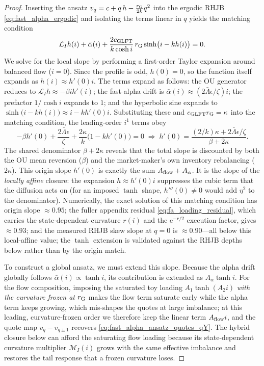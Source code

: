 \documentclass[11pt,a4paper]{article}
\newcommand{\Lcal}{\mathcal{L}}
\newcommand{\e}{\mathrm e}
\newcommand{\alphabar}{\bar\alpha}
\theoremstyle{plain}
\theoremstyle{definition}
\begin{document}
\begin{proof}
Inserting the ansatz \(v_q=c+q\,h-\frac{r_{\rm G}}{2k}q^2\) into the ergodic RHJB \eqref{eq:fast_alpha_ergodic} and isolating the terms linear in \(q\) yields the matching condition
\[
\Lcal_I h(i)+\alphabar(i)+\frac{2c_{\rm GLFT}}{k\cosh i}\,r_{\rm G}\sinh\bigl(i-kh(i)\bigr)=0.
\]
We solve for the local slope by performing a first-order Taylor expansion around balanced flow (\(i=0\)). Since the profile is odd, \(h(0)=0\), so the function itself expands as \(h(i)\approx h'(0)i\). The terms expand as follows: the OU generator reduces to \(\Lcal_I h\approx-\beta i h'(i)\); the fast-alpha drift is \(\alphabar(i)\approx(2\bar\Lambda\epsilon/\zeta)i\); the prefactor \(1/\cosh i\) expands to \(1\); and the hyperbolic sine expands to \(\sinh\bigl(i-kh(i)\bigr)\approx i-kh'(0)i\). Substituting these and \(c_{\rm GLFT}r_{\rm G}=\kappa\) into the matching condition, the leading-order \(i^1\) terms obey
\[
-\beta h'(0)+\frac{2\bar\Lambda\epsilon}{\zeta}+\frac{2\kappa}{k}\bigl(1-kh'(0)\bigr)=0
\;\Longrightarrow\;
h'(0)=\frac{(2/k)\kappa+2\bar\Lambda\epsilon/\zeta}{\beta+2\kappa}.
\]
The shared denominator \(\beta+2\kappa\) reveals that the total slope is discounted by both the OU mean reversion (\(\beta\)) and the market-maker's own inventory rebalancing (\(2\kappa\)).  This origin slope \(h'(0)\) is exactly the sum \(A_{\rm flow}+A_\alpha\).
It is the slope of the \emph{locally affine} closure: the expansion
\(h\approx h'(0)i\) suppresses the cubic term that the diffusion acts on (for an
imposed \(\tanh\) shape, \(h'''(0)\neq0\) would add \(\eta^2\) to the
denominator).  Numerically, the exact solution of this matching condition has origin slope
\(\approx0.95\); the fuller appendix residual \eqref{eq:fa_loading_residual},
which carries the state-dependent curvature \(r(i)\) and the \(\e^{-r/2}\)
execution factor, gives \(\approx0.93\); and the measured RHJB skew slope at
\(q=0\) is \(\approx0.90\)---all below this local-affine value; the \(\tanh\) extension is
validated against the RHJB depths below rather than by the origin match.

To construct a global ansatz, we must extend this slope. Because the alpha drift globally follows \(\alphabar(i)\propto\tanh i\), its contribution is extended as \(A_\alpha\tanh i\). For the flow composition, imposing the saturated toy loading \(A_1\tanh(A_2 i)\) \emph{with the curvature frozen at \(r_{\rm G}\)} makes the flow term saturate early while the alpha term keeps growing, which mis-shapes the quotes at large imbalance; at this leading, curvature-frozen order we therefore keep the linear term \(A_{\rm flow}i\), and the quote map \(v_q-v_{q\pm1}\) recovers \eqref{eq:fast_alpha_ansatz_quotes_qY}.  The hybrid closure below can afford the saturating flow loading because its state-dependent curvature multiplier \(\mathcal M_I(i)\) grows with the same effective imbalance and restores the tail response that a frozen curvature loses.
\end{proof}
\end{document}
